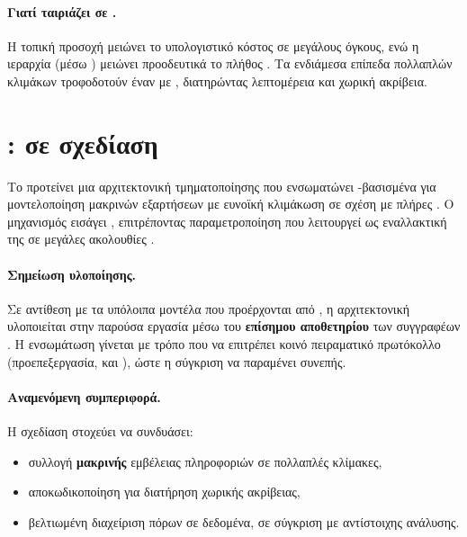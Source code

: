 \paragraph{Γιατί ταιριάζει σε .}
Η τοπική προσοχή μειώνει το υπολογιστικό κόστος σε μεγάλους όγκους, ενώ η ιεραρχία (μέσω ) μειώνει προοδευτικά το πλήθος . 
Τα ενδιάμεσα επίπεδα πολλαπλών κλιμάκων τροφοδοτούν έναν  με , διατηρώντας λεπτομέρεια και χωρική ακρίβεια.

\section{:  σε  σχεδίαση}
\label{sec:segmamba}

Το  προτείνει μια  αρχιτεκτονική τμηματοποίησης που
ενσωματώνει -βασισμένα  για μοντελοποίηση
μακρινών εξαρτήσεων με ευνοϊκή κλιμάκωση σε σχέση με πλήρες
 \cite{xing2024segmamba}. Ο μηχανισμός 
εισάγει , επιτρέποντας 
παραμετροποίηση που λειτουργεί ως εναλλακτική της  σε
μεγάλες ακολουθίες \cite{gu2023mamba}.

\paragraph{Σημείωση υλοποίησης.}
Σε αντίθεση με τα υπόλοιπα μοντέλα που προέρχονται από ,
η αρχιτεκτονική  υλοποιείται στην παρούσα εργασία μέσω του
\textbf{επίσημου αποθετηρίου} των συγγραφέων \cite{segmamba_github}. Η
ενσωμάτωση γίνεται με τρόπο που να επιτρέπει κοινό πειραματικό πρωτόκολλο
(προεπεξεργασία,  και ), ώστε η
σύγκριση να παραμένει συνεπής.

\paragraph{Αναμενόμενη συμπεριφορά.}
Η σχεδίαση στοχεύει να συνδυάσει:
\begin{itemize}
  \item συλλογή \textbf{μακρινής} εμβέλειας πληροφοριών σε πολλαπλές κλίμακες, 
  \item {} αποκωδικοποίηση για διατήρηση χωρικής ακρίβειας, 
  \item βελτιωμένη διαχείριση πόρων σε  δεδομένα, σε σύγκριση με  αντίστοιχης ανάλυσης.
\end{itemize}
  
